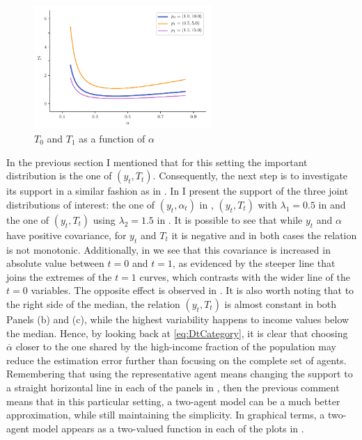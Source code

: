 \documentclass[english, a4paper, 12pt]{article}
\begin{document}
	\begin{figure}
		\caption{$T_{0}$ and $T_{1}$ as a function of $\alpha$}
		\label{fig:DiffTtLambda}
		\includegraphics[width = 0.6\textwidth]{TtLambdas}
		\vspace{-1.5ex}
	\end{figure}

In the previous section I mentioned that for this setting the important distribution is the one of $(y_{t}, T_{t})$. Consequently, the next step is to investigate its support in a similar fashion as in . In  I present the support of the three joint distributions of interest: the one of $(y_{t}, \alpha_{t})$ in , $(y_{t}, T_{t})$ with $\lambda_{1} = 0.5$ in  and the one of $(y_{t}, T_{t})$ using $\lambda_{2} = 1.5$ in . It is possible to see that while $y_{t}$ and $\alpha$ have positive covariance, for $y_{t}$ and $T_{t}$ it is negative and in both cases the relation is not monotonic. Additionally, in  we see that this covariance is increased in absolute value between $t = 0$ and $t = 1$, as evidenced by the steeper line that joins the extremes of the $t=1$ curves, which contrasts with the wider line of the $t=0$ variables. The opposite effect is observed in . It is also worth noting that to the right side of the median, the relation $(y_{t}, T_{t})$ is almost constant in both Panels (b) and (c), while the highest variability happens to income values below the median. Hence, by looking back at \eqref{eq:DtCategory}, it is clear that choosing $\overline{\alpha}$ closer to the one shared by the high-income fraction of the population may reduce the estimation error further than focusing on the complete set of agents. Remembering that using the representative agent means changing the support to a straight horizontal line in each of the panels in , then the previous comment means that in this particular setting, a two-agent model can be a much better approximation, while still maintaining the simplicity. In graphical terms, a two-agent model appears as a two-valued function in each of the plots in .
\end{document}
